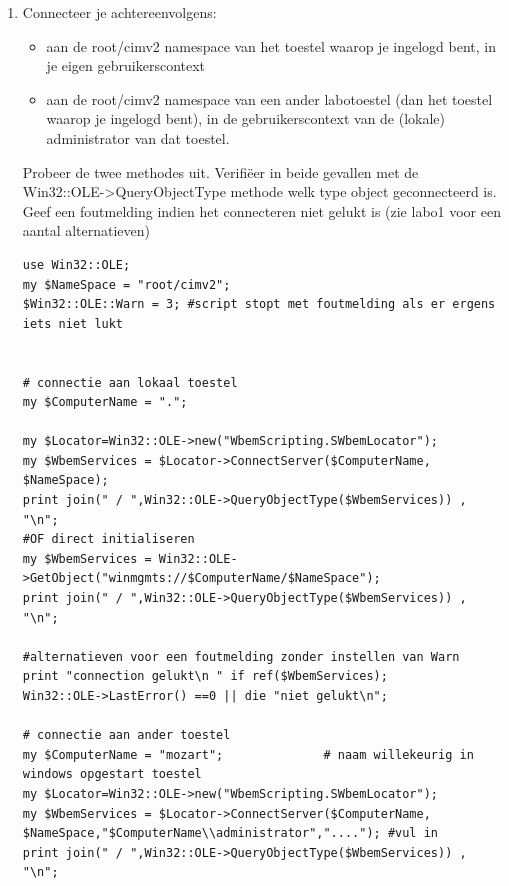 \documentclass[11pt,a4paper]{report}
\begin{document}
\begin{enumerate}[resume]
	\item Connecteer je achtereenvolgens:
	\begin{itemize}
		\item aan de root/cimv2 namespace van het toestel waarop je ingelogd bent, in je eigen gebruikerscontext
		\item aan de root/cimv2 namespace van een ander labotoestel (dan het toestel waarop je ingelogd bent), in de gebruikerscontext van de (lokale) administrator van dat toestel.
	\end{itemize}	
	Probeer de twee methodes uit. Verifiëer in beide gevallen met de Win32::OLE->QueryObjectType methode welk type object geconnecteerd is. Geef een foutmelding indien het connecteren niet gelukt is (zie labo1 voor een aantal alternatieven)
	\begin{lstlisting}
use Win32::OLE;
my $NameSpace = "root/cimv2";
$Win32::OLE::Warn = 3; #script stopt met foutmelding als er ergens iets niet lukt


# connectie aan lokaal toestel
my $ComputerName = ".";

my $Locator=Win32::OLE->new("WbemScripting.SWbemLocator");
my $WbemServices = $Locator->ConnectServer($ComputerName, $NameSpace);
print join(" / ",Win32::OLE->QueryObjectType($WbemServices)) , "\n";
#OF direct initialiseren
my $WbemServices = Win32::OLE->GetObject("winmgmts://$ComputerName/$NameSpace");
print join(" / ",Win32::OLE->QueryObjectType($WbemServices)) , "\n";

#alternatieven voor een foutmelding zonder instellen van Warn
print "connection gelukt\n " if ref($WbemServices);
Win32::OLE->LastError() ==0 || die "niet gelukt\n";

# connectie aan ander toestel
my $ComputerName = "mozart";              # naam willekeurig in windows opgestart toestel
my $Locator=Win32::OLE->new("WbemScripting.SWbemLocator");
my $WbemServices = $Locator->ConnectServer($ComputerName, $NameSpace,"$ComputerName\\administrator","...."); #vul in
print join(" / ",Win32::OLE->QueryObjectType($WbemServices)) , "\n";
	\end{lstlisting}
\end{enumerate}
\end{document}

